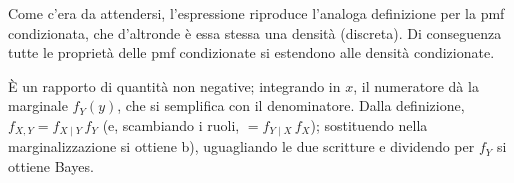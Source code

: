 
Come c'era da attendersi, l'espressione riproduce l'analoga definizione per la pmf condizionata, che d'altronde è essa
stessa una densità (discreta). Di conseguenza tutte le proprietà delle pmf condizionate si estendono alle densità
condizionate.


\begin{dimostrazione}
 È un rapporto di quantità non negative; integrando in $x$, il numeratore dà la marginale $f_Y(y)$, che si
semplifica con il denominatore.
 Dalla definizione, $f_{X,Y} = f_{X \mid Y}\, f_Y$ (e, scambiando i ruoli, $= f_{Y \mid X}\, f_X$); sostituendo
nella marginalizzazione si ottiene b), uguagliando le due scritture e dividendo per $f_Y$ si ottiene Bayes.
\end{dimostrazione}

